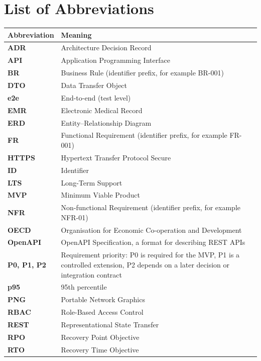 \documentclass[a4paper,12pt]{article}
\begin{document}
\tableofcontents
\clearpage
{}
{}
\listoffigures
\clearpage
{}
{}
\listoftables
\clearpage
{}
{}
\section*{List of Abbreviations}
\begingroup
\small
\renewcommand{\arraystretch}{1.18}
\begin{longtable}{@{}>{\bfseries}p{}p{}@{}}
\toprule
Abbreviation & Meaning \\
\midrule
\endhead
ADR & Architecture Decision Record \\
API & Application Programming Interface \\
BR & Business Rule (identifier prefix, for example BR-001) \\
DTO & Data Transfer Object \\
e2e & End-to-end (test level) \\
EMR & Electronic Medical Record \\
ERD & Entity--Relationship Diagram \\
FR & Functional Requirement (identifier prefix, for example FR-001) \\
HTTPS & Hypertext Transfer Protocol Secure \\
ID & Identifier \\
LTS & Long-Term Support \\
MVP & Minimum Viable Product \\
NFR & Non-functional Requirement (identifier prefix, for example NFR-01) \\
OECD & Organisation for Economic Co-operation and Development \\
OpenAPI & OpenAPI Specification, a format for describing REST APIs \\
P0, P1, P2 & Requirement priority: P0 is required for the MVP, P1 is a controlled extension, P2 depends on a later decision or integration contract \\
p95 & 95th percentile \\
PNG & Portable Network Graphics \\
RBAC & Role-Based Access Control \\
REST & Representational State Transfer \\
RPO & Recovery Point Objective \\
RTO & Recovery Time Objective \\

\end{longtable}
\end{document}
